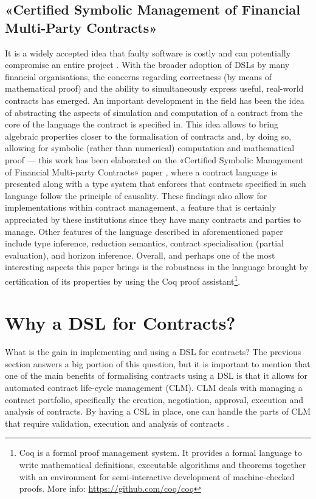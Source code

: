 \documentclass{ituthesis}
\begin{document}
\subsection{«Certified Symbolic Management of Financial Multi-Party Contracts»}

It is a widely accepted idea that faulty software is costly and can potentially compromise an entire project \cite{expensivesoftware}. With the broader adoption of DSLs by many financial organisations, the concerns regarding correctness (by means of mathematical proof) and the ability to simultaneously express useful, real-world contracts has emerged. An important development in the field has been the idea of abstracting the aspects of simulation and computation of a contract from the core of the language the contract is specified in. This idea allows to bring algebraic properties closer to the formalisation of contracts and, by doing so, allowing for symbolic (rather than numerical) computation and mathematical proof --- this work has been elaborated on the «Certified Symbolic Management of Financial Multi-party Contracts» paper \cite{bahr2015certified}, where a contract language is presented along with a type system that enforces that contracts specified in such language follow the principle of causality. These findings also allow for implementations within contract management, a feature that is certainly appreciated by these institutions since they have many contracts and parties to manage. Other features of the language described in aforementioned paper include type inference, reduction semantics, contract specialisation (partial evaluation), and horizon inference. Overall, and perhaps one of the most interesting aspects this paper brings is the robustness in the language brought by certification of its properties by using the Coq proof
assistant\footnote{Coq is a formal proof management system. It provides a formal language to write mathematical definitions, executable algorithms and theorems together with an environment for semi-interactive development of machine-checked proofs. More info: \url{https://github.com/coq/coq}}.

\section{Why a DSL for Contracts?}
What is the gain in implementing and using a DSL for contracts? The previous section answers a big portion of this question, but it is important to mention that one of the main benefits of formalising contracts using a DSL is that it allows for automated contract life-cycle management (CLM). CLM deals with managing a contract portfolio, specifically the creation, negotiation, approval, execution and analysis of contracts. By having a CSL in place, one can handle the parts of CLM that require validation, execution and analysis of contracts \cite{hvitved2011contract}.
\end{document}

